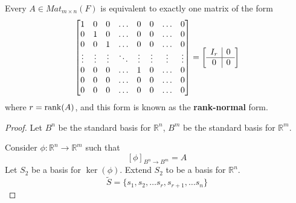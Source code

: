 \begin{theorem}     
    Every $A \in Mat_{m \times n}(F)$ is equivalent to exactly one matrix of the form 
\[ 
\begin{bmatrix}
    1 & 0 & 0 & \hdots & 0 & 0 & \hdots & 0 \\
    0 & 1 & 0 & \hdots & 0 & 0 & \hdots & 0 \\
    0 & 0 & 1 & \hdots & 0 & 0 & \hdots & 0 \\
    \vdots & \vdots & \vdots & \ddots & \vdots & \vdots & \vdots & \vdots \\
    0 & 0 & 0 & \hdots & 1 & 0 & \hdots & 0 \\
    0 & 0 & 0 & \hdots & 0 & 0 & \hdots & 0 \\
    0 & 0 & 0 & \hdots & 0 & 0 & \hdots & 0 \\
\end{bmatrix} = \left[
    \begin{array}{c | c}
    I_r & 0 \\
    \hline
    0 & 0
    \end{array}
\right]
\]
where $r = \rank(A)$, and this form is known as the \textbf{rank-normal} form.
\end{theorem}       

\begin{proof}       
    Let $B^n$ be the standard basis for $\mathbb{R}^n$, $B^m$ be the standard basis for $\mathbb{R}^m$. 

    Consider $\phi: \mathbb{R}^n \to \mathbb{R}^m$ such that 
    \[
        \left[ \phi \right]_{B^n \to B^m} = A
    \]
    Let $S_2$ be a basis for $\ker( \phi)$. Extend $S_2$ to be a basis for $\mathbb{R}^n$. \\

    \[
        \tilde{S} = \{s_1, s_2, \hdots s_r, s_{r + 1}, \hdots s_n \} 
    \]
    
\end{proof}     








\newpage